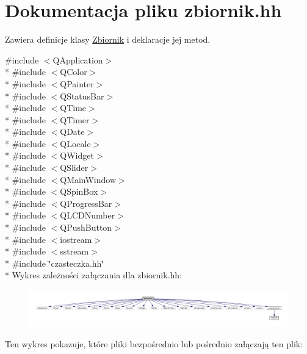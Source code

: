 \hypertarget{zbiornik_8hh}{\section{Dokumentacja pliku zbiornik.\-hh}
\label{zbiornik_8hh}
}


Zawiera definicje klasy \hyperlink{class_zbiornik}{Zbiornik} i deklaracje jej metod.  


{\ttfamily \#include $<$Q\-Application$>$}\\*
{\ttfamily \#include $<$Q\-Color$>$}\\*
{\ttfamily \#include $<$Q\-Painter$>$}\\*
{\ttfamily \#include $<$Q\-Status\-Bar$>$}\\*
{\ttfamily \#include $<$Q\-Time$>$}\\*
{\ttfamily \#include $<$Q\-Timer$>$}\\*
{\ttfamily \#include $<$Q\-Date$>$}\\*
{\ttfamily \#include $<$Q\-Locale$>$}\\*
{\ttfamily \#include $<$Q\-Widget$>$}\\*
{\ttfamily \#include $<$Q\-Slider$>$}\\*
{\ttfamily \#include $<$Q\-Main\-Window$>$}\\*
{\ttfamily \#include $<$Q\-Spin\-Box$>$}\\*
{\ttfamily \#include $<$Q\-Progress\-Bar$>$}\\*
{\ttfamily \#include $<$Q\-L\-C\-D\-Number$>$}\\*
{\ttfamily \#include $<$Q\-Push\-Button$>$}\\*
{\ttfamily \#include $<$iostream$>$}\\*
{\ttfamily \#include $<$sstream$>$}\\*
{\ttfamily \#include \char`\"{}czasteczka.\-hh\char`\"{}}\\*
Wykres zależności załączania dla zbiornik.\-hh\-:
\nopagebreak
\begin{figure}[H]
\begin{center}
\leavevmode
\includegraphics[width=350pt]{zbiornik_8hh__incl}
\end{center}
\end{figure}
Ten wykres pokazuje, które pliki bezpośrednio lub pośrednio załączają ten plik\-:
